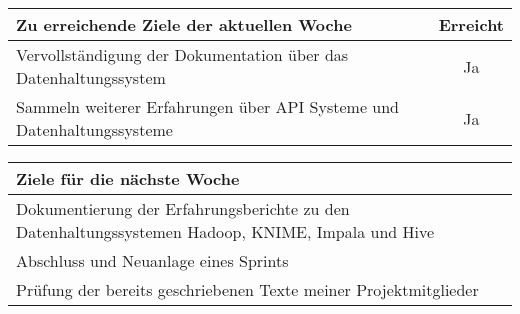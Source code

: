 \begin{tabularx}{\textwidth}{Xc}
    \arrayrulecolor{OliveGreen}
    \toprule
    {\bfseries Zu erreichende Ziele der aktuellen Woche} & {\bfseries Erreicht} \\
    \midrule[2pt]
    Vervollständigung der Dokumentation über das Datenhaltungssystem  &  Ja  \\
    \rowcolor{OliveGreen!15}
    Sammeln weiterer Erfahrungen über API Systeme und
    Datenhaltungssysteme  &  Ja  \\
    \bottomrule[2pt]
\end{tabularx}
%
\vspace{1cm}
%
\begin{tabularx}{\textwidth}{Xc}
    \arrayrulecolor{OliveGreen}
    \toprule
    {\bfseries Ziele für die nächste Woche}              &                   \\
    \midrule[2pt]
    Dokumentierung der Erfahrungsberichte zu den Datenhaltungssystemen Hadoop,
    KNIME, Impala und Hive & \\
    \rowcolor{OliveGreen!15}
    Abschluss und Neuanlage eines Sprints & \\
    \rowcolor{White}
    Prüfung der bereits geschriebenen Texte meiner Projektmitglieder & \\
\end{tabularx}
